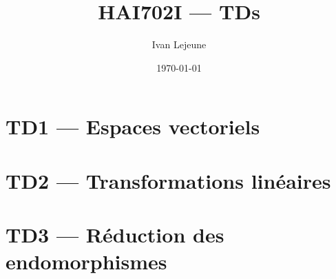 \documentclass[french,a4paper,10pt]{article}
\title{\color{astral} \sffamily \bfseries HAI702I --- TDs}
\author{Ivan Lejeune}
\date{\today}
\begin{document}
    \maketitle
    \tableofcontents

    \newpage
    \section*{TD1 --- Espaces vectoriels}\label{sec:TD1}
    \setcounter{section}{1}
    \setcounter{tdcounter}{0}
    

    \newpage
    \section*{TD2 --- Transformations linéaires}\label{sec:TD2}
    \setcounter{section}{2}
    \setcounter{tdcounter}{0}
    

    \newpage
    \section*{TD3 --- Réduction des endomorphismes}\label{sec:TD3}
    \setcounter{section}{3}
    \setcounter{tdcounter}{0}
    
\end{document}
